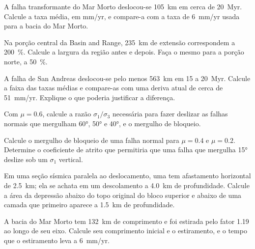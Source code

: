 \begin{exercise}[$\star$]\label{exo:b3:extension-strike-slip:3}
A falha transformante do Mar Morto deslocou-se \qty{105}{km} em cerca de \qty{20}{Myr}.
Calcule a taxa média, em \unit{mm/yr}, e compare-a com a taxa de \qty{6}{mm/yr}
usada para a bacia do Mar Morto.
\end{exercise}

\begin{exercise}[$\star$]\label{exo:b3:extension-strike-slip:4}
Na porção central da Basin and Range, \qty{235}{km} de extensão correspondem a
\qty{200}{\percent}. Calcule a largura da região antes e depois. Faça o
mesmo para a porção norte, a \qty{50}{\percent}.
\end{exercise}

\begin{exercise}[$\star\star$]\label{exo:b3:extension-strike-slip:5}
A falha de San Andreas deslocou-se pelo menos \qty{563}{km} em 15 a
\qty{20}{Myr}. Calcule a faixa das taxas médias e compare-as com uma
deriva atual de cerca de \qty{51}{mm/yr}. Explique o que poderia justificar a diferença.
\end{exercise}

\begin{exercise}[$\star\star$]\label{exo:b3:extension-strike-slip:6}
Com $\mu = 0.6$, calcule a razão $\sigma_1/\sigma_3$ necessária para fazer deslizar as falhas normais
que mergulham \ang{60}, \ang{50} e \ang{40}, e o mergulho de bloqueio.
\end{exercise}

\begin{exercise}[$\star\star$]\label{exo:b3:extension-strike-slip:7}
Calcule o mergulho de bloqueio de uma falha normal para $\mu = 0.4$ e $\mu = 0.2$.
Determine o coeficiente de atrito que permitiria que uma falha que mergulha \ang{15} deslize sob um
$\sigma_1$ vertical.
\end{exercise}

\begin{exercise}[$\star\star$]\label{exo:b3:extension-strike-slip:8}
Em uma seção sísmica paralela ao deslocamento, uma  tem afastamento horizontal de
\qty{2.5}{km}; ela se achata em um descolamento a \qty{4.0}{km} de profundidade. Calcule a
área da depressão abaixo do topo original do bloco superior e abaixo de uma camada
que primeiro aparece a \qty{1.5}{km} de profundidade.
\end{exercise}

\begin{exercise}[$\star\star$]\label{exo:b3:extension-strike-slip:9}
A bacia do Mar Morto tem \qty{132}{km} de comprimento e foi estirada pelo fator 1.19
ao longo de seu eixo. Calcule seu comprimento inicial e o estiramento, e o tempo
que o estiramento leva a \qty{6}{mm/yr}.
\end{exercise}


